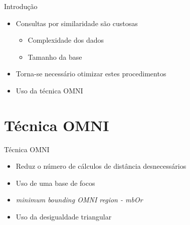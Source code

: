 \documentclass{beamer}
\begin{document}
\begin{frame}{Introdução}

  \begin{itemize}
   \item Consultas por similaridade são custosas\newline
   
   \begin{itemize}
      \item Complexidade dos dados\newline
      \item Tamanho da base\newline
   \end{itemize}
   
   \item Torna-se necessário otimizar estes procedimentos\newline
   
   \item Uso da técnica OMNI
  \end{itemize}

 
\end{frame}

\section{Técnica OMNI}

\begin{frame}{Técnica OMNI}

  \begin{itemize}
   \item Reduz o número de cálculos de distância desnecessários\newline
   
   \item Uso de uma base de focos\newline
   
   \item \textit{minimum bounding OMNI region - mbOr}\newline
   
   \item Uso da desigualdade triangular

  \end{itemize}

 
\end{frame}
\end{document}
